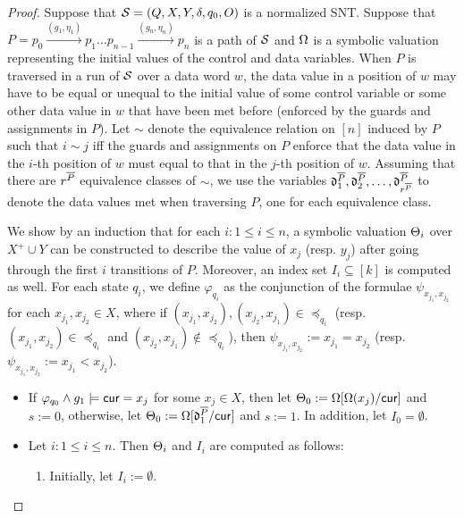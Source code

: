 \begin{appendix}
\begin{proof}
Suppose that ${\mathcal{S} }=(Q,X,Y, \delta,q_0,O)$ is a normalized SNT. Suppose that $P=p_0 \xrightarrow{(g_1,\eta_1)} p_1 \dots p_{n-1} \xrightarrow{(g_n,\eta_n)} p_{n}$ is a path of ${\mathcal{S} }$ and $\Omega$ is a symbolic valuation representing the  initial values of the control and data variables.  When $P$ is traversed in a run of ${\mathcal{S} }$ over a data word $w$,  the data value in a position of $w$ may have to be equal or unequal to the initial value of some control variable or some other data value in $w$ that have been met before (enforced by the guards and assignments in $P$). Let $\sim$ denote the equivalence relation on $[n]$ induced by $P$ such that $i \sim j$ iff the guards and assignments on $P$ enforce that the data value in the $i$-th position of $w$ must equal to that in the $j$-th position of $w$. Assuming that there are $r^{\overline{P}}$ equivalence classes of $\sim$, we use the variables $\mathfrak{d}^{\overline{P}}_1,\mathfrak{d}^{\overline{P}}_2,\dots, \mathfrak{d}^{\overline{P}}_{r^{\overline{P}}}$ to denote the data values met when traversing $P$, one for each equivalence class. 

We show by an induction that for each $i: 1 \le i \le n$, a symbolic valuation $\Theta_i$ over $X^+ \cup Y$ can be constructed  to describe the value of $x_j$ (resp. $y_j$) after going through the first $i$ transitions of $P$. Moreover, an index set $I_i \subseteq [k]$ is computed as well. For each state $q_i$,  we define $\varphi_{q_i}$ as the conjunction of the formulae $\psi_{x_{j_1}, x_{j_2}}$ for each $x_{j_1}, x_{j_2} \in X$, where if $(x_{j_1}, x_{j_2}), (x_{j_2}, x_{j_1}) \in \preceq_{q_i}$ (resp. $(x_{j_1}, x_{j_2}) \in \preceq_{q_i}$ and $(x_{j_2}, x_{j_1}) \not \in \preceq_{q_i}$), then $\psi_{x_{j_1}, x_{j_2}} := x_{j_1} = x_{j_2}$ (resp. $\psi_{x_{j_1}, x_{j_2}} := x_{j_1} < x_{j_2}$).
%
\begin{itemize}
\item If $\varphi_{q_0} \wedge g_1 \models \mathsf{cur} = x_j$ for some $x_j \in X$, then let $\Theta_0:=\Omega[ \Omega(x_j) / \mathsf{cur}]$ and $s:=0$, otherwise, let $\Theta_0:=\Omega[\mathfrak{d}^{\overline{P}}_1/\mathsf{cur}]$ and $s := 1$. In addition, let $I_0 = \emptyset$.
%
%
\item Let $i: 1 \le i \le n$.  
 Then $\Theta_i$ and $I_i$ are computed as follows: 
\begin{enumerate}
\item Initially, let $I_i := \emptyset$. 


\end{enumerate}
\end{itemize}
\end{proof}
\end{appendix}

